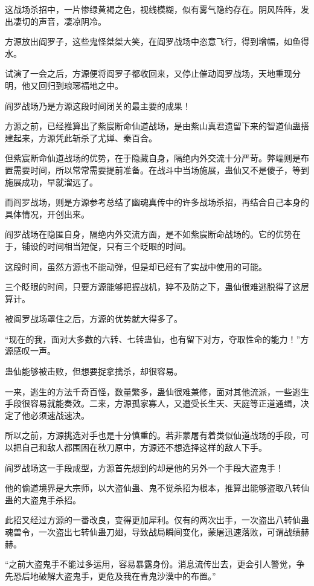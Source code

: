 \begin{this_body}
这战场杀招中，一片惨绿黄褐之色，视线模糊，似有雾气隐约存在。阴风阵阵，发出凄切的声音，凄凉阴冷。

方源放出阎罗子，这些鬼怪桀桀大笑，在阎罗战场中恣意飞行，得到增幅，如鱼得水。

试演了一会之后，方源便将阎罗子都收回来，又停止催动阎罗战场，天地重现分明，他又回归到琅琊福地之中。

阎罗战场乃是方源这段时间闭关的最主要的成果！

方源之前，已经推算出了紫宸断命仙道战场，是由紫山真君遗留下来的智道仙蛊搭建起来，方源凭此斩杀了尤婵、秦百合。

但紫宸断命仙道战场的优势，在于隐藏自身，隔绝内外交流十分严苛。弊端则是布置需要时间，所以常常需要提前准备。在战斗中当场施展，蛊仙又不是傻子，等到施展成功，早就溜远了。

而阎罗战场，则是方源参考总结了幽魂真传中的许多战场杀招，再结合自己本身的具体情况，开创出来。

阎罗战场在隐匿自身，隔绝内外交流方面，是不如紫宸断命战场的。它的优势在于，铺设的时间相当短促，只有三个眨眼的时间。

这段时间，虽然方源也不能动弹，但是却已经有了实战中使用的可能。

三个眨眼的时间，只要方源能够把握战机，猝不及防之下，蛊仙很难逃脱得了这层算计。

被阎罗战场罩住之后，方源的优势就大得多了。

“现在的我，面对大多数的六转、七转蛊仙，也有留下对方，夺取性命的能力！”方源感叹一声。

蛊仙能够被击败，但想要捉拿擒杀，却很容易。

一来，逃生的方法千奇百怪，数量繁多，蛊仙很难兼修，面对其他流派，一些逃生手段很容易就能奏效。二来，方源孤家寡人，又遭受长生天、天庭等正道通缉，决定了他必须速战速决。

所以之前，方源挑选对手也是十分慎重的。若非蒙屠有着类似仙道战场的手段，可以把自己和敌人都围困在秋刀原中，方源还不想选择这样的敌人下手。

阎罗战场这一手段成型，方源首先想到的却是他的另外一个手段大盗鬼手！

他的偷道境界是大宗师，以大盗仙蛊、鬼不觉杀招为根本，推算出能够盗取八转仙蛊的大盗鬼手杀招。

此招又经过方源的一番改良，变得更加犀利。仅有的两次出手，一次盗出八转仙蛊魂兽令，一次盗出七转仙蛊刀翅，导致战局瞬间变化，蒙屠迅速落败，可谓战绩赫赫。

“之前大盗鬼手不能过多运用，容易暴露身份。消息流传出去，更会引人警觉，争先恐后地破解大盗鬼手，更危及我在青鬼沙漠中的布置。”


\end{this_body}
